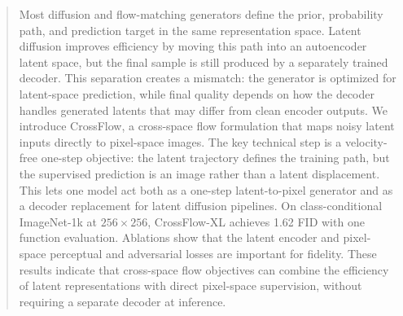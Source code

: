 \begin{abstract}
Most diffusion and flow-matching generators define the prior, probability path, and prediction target in the same representation space. Latent diffusion improves efficiency by moving this path into an autoencoder latent space, but the final sample is still produced by a separately trained decoder. This separation creates a mismatch: the generator is optimized for latent-space prediction, while final quality depends on how the decoder handles generated latents that may differ from clean encoder outputs. We introduce CrossFlow, a cross-space flow formulation that maps noisy latent inputs directly to pixel-space images. The key technical step is a velocity-free one-step objective: the latent trajectory defines the training path, but the supervised prediction is an image rather than a latent displacement. This lets one model act both as a one-step latent-to-pixel generator and as a decoder replacement for latent diffusion pipelines. On class-conditional ImageNet-1k at $256\times256$, CrossFlow-XL achieves 1.62 FID with one function evaluation. Ablations show that the latent encoder and pixel-space perceptual and adversarial losses are important for fidelity. These results indicate that cross-space flow objectives can combine the efficiency of latent representations with direct pixel-space supervision, without requiring a separate decoder at inference.
\end{abstract}
